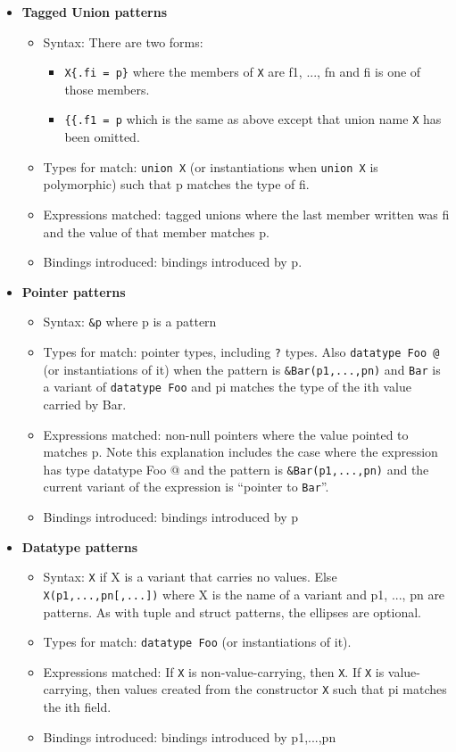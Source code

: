 \begin{itemize}
\item \textbf{Tagged Union patterns}
  \begin{itemize}
  \item Syntax: There are two forms:
    \begin{itemize}
    \item \verb|X{.fi = p}|
      where the members of \texttt{X}
      are f1, ..., fn and fi is one of those members.
    \item \verb|{{.f1 = p| which is the same as above
      except that union name \texttt{X} has been omitted.
    \end{itemize}
  \item Types for match: \texttt{union X} (or instantiations when
    \texttt{union X} is polymorphic) such that p matches the type of
    fi.
  \item Expressions matched: tagged unions where the last member
    written was fi and the value of that member matches p.
  \item Bindings introduced: bindings introduced by p.
  \end{itemize}
  
\item \textbf{Pointer patterns}
  \begin{itemize}
  \item Syntax: \texttt{\&p} where p is a pattern
  \item Types for match: pointer types, including \texttt{?} types.
    Also \texttt{datatype Foo @} (or instantiations of it) when the pattern
    is \texttt{\&Bar(p1,...,pn)} and \texttt{Bar} is a
    variant of \texttt{datatype Foo} and pi matches the type of the ith
    value carried by Bar.
  \item Expressions matched: non-null pointers where the value pointed
    to matches p.  Note this explanation includes the case where the
    expression has type datatype Foo @ and the pattern is
    \texttt{\&Bar(p1,...,pn)} and the current variant of the expression is
    ``pointer to \texttt{Bar}''.
  \item Bindings introduced: bindings introduced by p
  \end{itemize}
  
\item \textbf{Datatype patterns}
  \begin{itemize}
  \item Syntax: \texttt{X} if X is a variant that carries no values.
    Else \texttt{X(p1,...,pn[,...])} where X is the name of a variant 
    and p1, ..., pn are patterns.  As with tuple and struct patterns,
    the ellipses are optional.  
  \item Types for match: \texttt{datatype Foo} (or instantiations of
    it). 
  \item Expressions matched: If \texttt{X} is non-value-carrying, then
    \texttt{X}.  If \texttt{X} is value-carrying, then values created from
    the constructor \texttt{X} such that pi matches the ith field.  
  \item Bindings introduced: bindings introduced by p1,...,pn
  \end{itemize}
\end{itemize}

